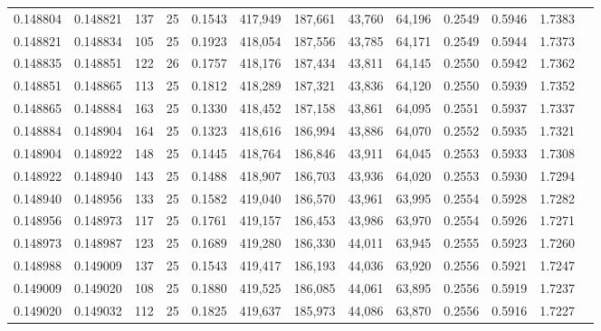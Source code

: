 \begin{tabular}{rrrrrrrrrrrrr}
0.148804 & 0.148821 &   137 &  25 &                                     0.1543 & 417,949 & 187,661 &  43,760 &  64,196 & 0.2549 & 0.5946 & 1.7383 \\
0.148821 & 0.148834 &   105 &  25 &                                     0.1923 & 418,054 & 187,556 &  43,785 &  64,171 & 0.2549 & 0.5944 & 1.7373 \\
0.148835 & 0.148851 &   122 &  26 &                                     0.1757 & 418,176 & 187,434 &  43,811 &  64,145 & 0.2550 & 0.5942 & 1.7362 \\
0.148851 & 0.148865 &   113 &  25 &                                     0.1812 & 418,289 & 187,321 &  43,836 &  64,120 & 0.2550 & 0.5939 & 1.7352 \\
0.148865 & 0.148884 &   163 &  25 &                                     0.1330 & 418,452 & 187,158 &  43,861 &  64,095 & 0.2551 & 0.5937 & 1.7337 \\
0.148884 & 0.148904 &   164 &  25 &                                     0.1323 & 418,616 & 186,994 &  43,886 &  64,070 & 0.2552 & 0.5935 & 1.7321 \\
0.148904 & 0.148922 &   148 &  25 &                                     0.1445 & 418,764 & 186,846 &  43,911 &  64,045 & 0.2553 & 0.5933 & 1.7308 \\
0.148922 & 0.148940 &   143 &  25 &                                     0.1488 & 418,907 & 186,703 &  43,936 &  64,020 & 0.2553 & 0.5930 & 1.7294 \\
0.148940 & 0.148956 &   133 &  25 &                                     0.1582 & 419,040 & 186,570 &  43,961 &  63,995 & 0.2554 & 0.5928 & 1.7282 \\
0.148956 & 0.148973 &   117 &  25 &                                     0.1761 & 419,157 & 186,453 &  43,986 &  63,970 & 0.2554 & 0.5926 & 1.7271 \\
0.148973 & 0.148987 &   123 &  25 &                                     0.1689 & 419,280 & 186,330 &  44,011 &  63,945 & 0.2555 & 0.5923 & 1.7260 \\
0.148988 & 0.149009 &   137 &  25 &                                     0.1543 & 419,417 & 186,193 &  44,036 &  63,920 & 0.2556 & 0.5921 & 1.7247 \\
0.149009 & 0.149020 &   108 &  25 &                                     0.1880 & 419,525 & 186,085 &  44,061 &  63,895 & 0.2556 & 0.5919 & 1.7237 \\
0.149020 & 0.149032 &   112 &  25 &                                     0.1825 & 419,637 & 185,973 &  44,086 &  63,870 & 0.2556 & 0.5916 & 1.7227 \\

\end{tabular}
